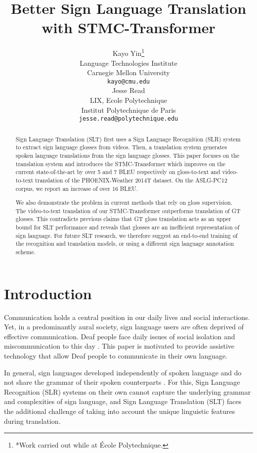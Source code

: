 \documentclass[11pt]{article}
\title{Better Sign Language Translation with STMC-Transformer}
\author{Kayo Yin\thanks{*Work carried out while at École Polytechnique.} \\
  Language Technologies Institute\\
  Carnegie Mellon University \\
  {\tt kayo@cmu.edu} \\\And
  Jesse Read \\
  LIX, Ecole Polytechnique \\
  Institut Polytechnique de Paris \\
  {\tt jesse.read@polytechnique.edu} \\}
\date{}
\begin{document}
\maketitle
\begin{abstract}
Sign Language Translation (SLT) first uses a Sign Language Recognition (SLR) system to extract sign language glosses from videos. Then, a translation system generates spoken language translations from the sign language glosses. This paper focuses on the translation system and introduces the STMC-Transformer which improves on the current state-of-the-art by over 5 and 7 BLEU respectively on gloss-to-text and video-to-text translation of the PHOENIX-Weather 2014T dataset. On the ASLG-PC12 corpus, we report an increase of over 16 BLEU. 

We also demonstrate the problem in current methods that rely on gloss supervision. The video-to-text translation of our STMC-Transformer outperforms translation of GT glosses. This contradicts previous claims that GT gloss translation acts as an upper bound for SLT performance and reveals that glosses are an inefficient representation of sign language. For future SLT research, we therefore suggest an end-to-end training of the recognition and translation models, or using a different sign language annotation scheme.
\end{abstract}


\section{Introduction}
\label{intro}



Communication holds a central position in our daily lives and social interactions. Yet, in a predominantly aural society, sign language users are often deprived of effective communication. Deaf people face daily issues of social isolation and miscommunication to this day \cite{SOUZA2017}. This paper is motivated to provide assistive technology that allow Deaf people to communicate in their own language.

In general, sign languages developed independently of spoken language and do not share the grammar of their spoken counterparts \cite{stokoe}. For this, Sign Language Recognition (SLR) systems on their own cannot capture the underlying grammar and complexities of sign language, and Sign Language Translation (SLT) faces the additional challenge of taking into account the unique linguistic features during translation.
\end{document}

